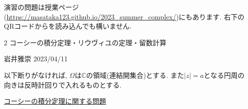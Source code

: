 \documentclass[dvipdfmx,a4paper,11pt]{article}
\newcommand{\C}{\mathbb{C}}
\theoremstyle{definition}
\begin{document}
演習の問題は授業ページ(\url{https://masataka123.github.io/2023_summer_complex/})にもあります. 右下のQRコードからを読み込んでも構いません.
\newpage


\begin{center}
{\Large 2 コーシーの積分定理・リウヴィユの定理・留数計算}
\end{center}

\begin{flushright}
 岩井雅崇 2023/04/11
\end{flushright}
以下断りがなければ, $\Omega$は$\C$の領域(連結開集合)とする.
また$|z|=a$となる円周の向きは反時計回りで入れるものとする. 

\vspace{12pt}
\hspace{-24pt}\underline{コーシーの積分定理に関する問題}
\end{document}
